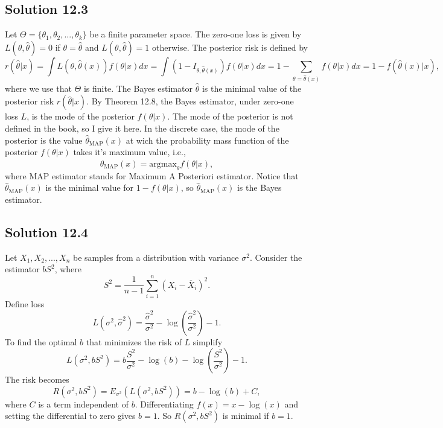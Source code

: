 \subsection*{Solution 12.3}

Let $\Theta = \{\theta_1, \theta_2, ..., \theta_k\}$ be a finite parameter space.
The zero-one loss is given by $L(\theta, \hat{\theta}) = 0$ if $\theta = \hat{\theta}$ and $L(\theta, \hat{\theta}) = 1$ otherwise.
The posterior risk is defined by
\begin{equation*}
    r(\hat{\theta}|x) = \int L(\theta, \hat{\theta}(x)) f(\theta|x) dx
        = \int \left(1 - I_{\theta, \hat{\theta}(x)}\right) f(\theta|x) dx
        = 1 - \sum_{\theta = \hat{\theta}(x)} f(\theta|x) dx
        = 1 - f(\hat{\theta}(x)|x),
\end{equation*}
where we use that $\Theta$ is finite.
The Bayes estimator $\hat{\theta}$ is the minimal value of the posterior risk $r(\hat{\theta}|x)$.
By Theorem 12.8, the Bayes estimator, under zero-one loss $L$, is the mode of the posterior $f(\theta|x)$.
The mode of the posterior is not defined in the book, so I give it here.
In the discrete case, the mode of the posterior is the value $\hat{\theta}_{\mathrm{MAP}}(x)$ at wich the probability mass function of the posterior $f(\theta|x)$ takes it's maximum value, i.e.,
\begin{equation*}
    \hat{\theta}_{\mathrm{MAP}}(x) = \mathrm{argmax}_{\theta} f(\theta|x),
\end{equation*}
where MAP estimator stands for Maximum A Posteriori estimator.
Notice that $\hat{\theta}_{\mathrm{MAP}}(x)$ is the minimal value for $1 - f(\theta|x)$, so $\hat{\theta}_{\mathrm{MAP}}(x)$ is the Bayes estimator.


\subsection*{Solution 12.4}

Let $X_1, X_2, ..., X_n$ be samples from a distribution with variance $\sigma^2$.
Consider the estimator $bS^2$, where
\begin{equation*}
    S^2 = \frac{1}{n - 1} \sum_{i = 1}^n (X_i - \overline{X}_i)^2.
\end{equation*}
Define loss
\begin{equation*}
    L(\sigma^2, \hat{\sigma}^2) = \frac{\hat{\sigma}^2}{\sigma^2} - \log\left(\frac{\hat{\sigma}^2}{\sigma^2}\right) - 1.
\end{equation*}
To find the optimal $b$ that minimizes the risk of $L$ simplify
\begin{equation*}
    L(\sigma^2, bS^2) = b \frac{S^2}{\sigma^2} - \log(b) - \log\left(\frac{S^2}{\sigma^2}\right) - 1.
\end{equation*}
The risk becomes
\begin{equation*}
    R(\sigma^2, bS^2) = E_{\sigma^2}(L(\sigma^2, bS^2))
        = b - \log(b) + C,
\end{equation*}
where $C$ is a term independent of $b$.
Differentiating $f(x) = x - \log(x)$ and setting the differential to zero gives $b = 1$.
So $R(\sigma^2, bS^2)$ is minimal if $b = 1$.


